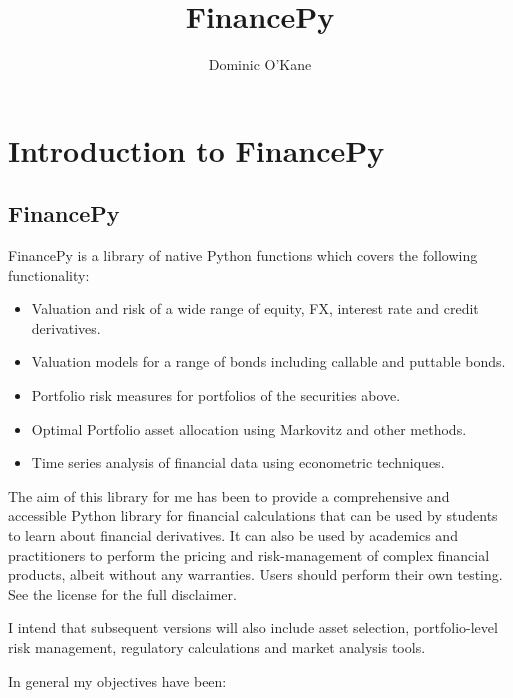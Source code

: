 \documentclass[twoside,11pt]{book}
\begin{document}
\title{{\Huge \bf FinancePy}}
\author{Dominic O'Kane}

\maketitle 

\cleardoublepage

\setcounter{tocdepth}{1}
\tableofcontents

\setcounter{page}{1}

\chapter{Introduction to FinancePy}

\section*{FinancePy}

FinancePy is a library of native Python functions which covers the following functionality:

\begin{itemize}
\item{ Valuation and risk of a wide range of equity, FX, interest rate and credit derivatives.
}
\item{ Valuation models for a range of bonds including callable and puttable bonds.
}
\item{ Portfolio risk measures for portfolios of the securities above.
}
\item{ Optimal Portfolio asset allocation using Markovitz and other methods.
}
\item{ Time series analysis of financial data using econometric techniques.
}
\end{itemize}

The aim of this library for me has been to provide a comprehensive and accessible Python library for financial calculations that can be used by students to learn about financial derivatives. It can also be used by academics and practitioners to perform the pricing and risk-management of complex financial products, albeit without any warranties. Users should perform their own testing. See the license for the full disclaimer.

I intend that subsequent versions will also include asset selection, portfolio-level risk management, regulatory calculations and market analysis tools.

In general my objectives have been:
\end{document}

